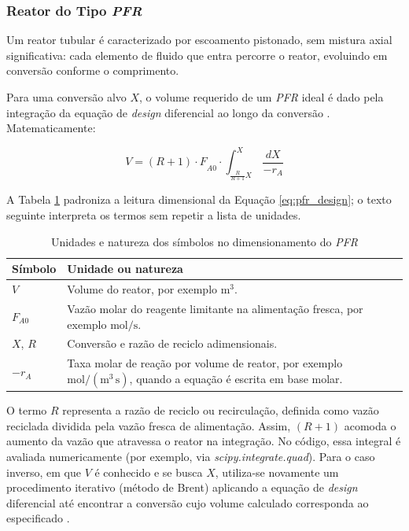 \subsubsection{Reator do Tipo \textit{PFR}}

Um reator tubular é caracterizado por escoamento pistonado, sem mistura axial significativa: cada elemento de fluido que entra percorre o reator, evoluindo em conversão conforme o comprimento.

Para uma conversão alvo $X$, o volume requerido de um \textit{PFR} ideal é dado pela integração da equação de \textit{design} diferencial ao longo da conversão \cite{levenspiel2000}. Matematicamente:

\begin{equation}
V = {( R + 1 ) \cdot F}_{A 0} \cdot \int_{\frac{R}{R + 1} X \ }^{X} \frac{d X}{- r_{A}}
\label{eq:pfr_design}
\end{equation}

A Tabela \ref{tab:unidades-pfr} padroniza a leitura dimensional da Equação \ref{eq:pfr_design}; o texto seguinte interpreta os termos sem repetir a lista de unidades.

\begin{table}[H]
    \centering
    \caption{Unidades e natureza dos símbolos no dimensionamento do \textit{PFR}}
    \label{tab:unidades-pfr}
    \begin{tabular}{|p{}|p{}|}
        \hline
        \textbf{Símbolo} & \textbf{Unidade ou natureza} \\ \hline
        $V$ & Volume do reator, por exemplo $\mathrm{m^3}$. \\ \hline
        $F_{A0}$ & Vazão molar do reagente limitante na alimentação fresca, por exemplo $\mathrm{mol/s}$. \\ \hline
        $X$, $R$ & Conversão e razão de reciclo adimensionais. \\ \hline
        $-r_A$ & Taxa molar de reação por volume de reator, por exemplo $\mathrm{mol/(m^3\,s)}$, quando a equação é escrita em base molar. \\ \hline
    \end{tabular}
\end{table}

O termo $R$ representa a razão de reciclo ou recirculação, definida como vazão reciclada dividida pela vazão fresca de alimentação. Assim, $( R + 1 )$ acomoda o aumento da vazão que atravessa o reator na integração. No código, essa integral é avaliada numericamente (por exemplo, via \textit{scipy.integrate.quad}). Para o caso inverso, em que $V$ é conhecido e se busca $X$, utiliza-se novamente um procedimento iterativo (método de Brent) aplicando a equação de \textit{design} diferencial até encontrar a conversão cujo volume calculado corresponda ao especificado \cite{fogler2009}.

